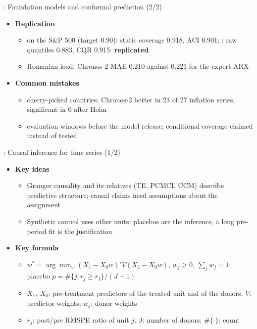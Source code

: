 \begin{frame}{: Foundation models and conformal prediction (2/2)}
\itemsize{\small}
\begin{itemize}
    \item \textbf{Replication}
    \begin{itemize}
        \item {} on the S\&P 500 (target 0.90): static coverage 0.918, ACI 0.901; : raw quantiles 0.883, CQR 0.915: \textbf{replicated}
        \item Romanian load: Chronos-2 MAE 0.210 against 0.221 for the expert ARX
    \end{itemize}
    \item \textbf{Common mistakes}
    \begin{itemize}
        \item cherry-picked countries: Chronos-2 better in 23 of 27 inflation series, significant in 0 after Holm
        \item evaluation windows before the model release; conditional coverage claimed instead of tested
    \end{itemize}
\end{itemize}
\end{frame}

\begin{frame}{: Causal inference for time series (1/2)}
\itemsize{\footnotesize}
\begin{itemize}
    \item \textbf{Key ideas}
    \begin{itemize}
        \item Granger causality and its relatives (TE, PCMCI, CCM) describe predictive structure; causal claims need assumptions about the assignment
        \item Synthetic control uses other units: placebos are the inference, a long pre-period fit is the justification
    \end{itemize}
    \item \textbf{Key formula}
    \begin{itemize}
        \item $w^* = \arg\min_w(X_1 - X_0w)'V(X_1 - X_0w)$, $w_j \ge 0$, $\sum_jw_j = 1$; placebo $p = \#\{j: r_j \ge r_1\}/(J + 1)$
        \item $X_1$, $X_0$: pre-treatment predictors of the treated unit and of the donors; $V$: predictor weights; $w_j$: donor weights
        \item $r_j$: post/pre RMSPE ratio of unit $j$; $J$: number of donors; $\#\{\cdot\}$: count
    \end{itemize}
\end{itemize}
\end{frame}

